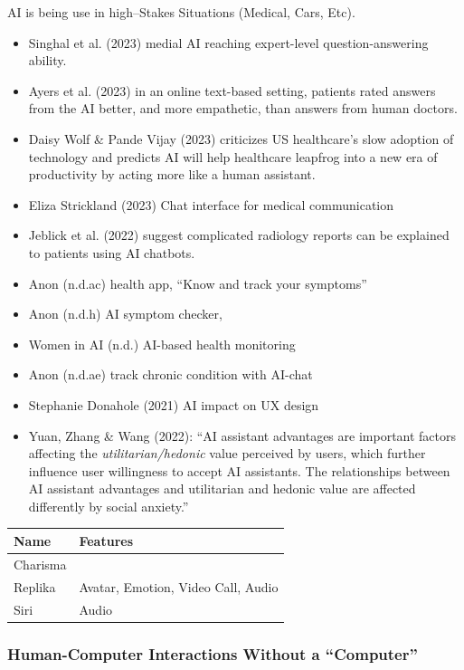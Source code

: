 \documentclass[
  letterpaper,
  DIV=11,
  numbers=noendperiod]{scrartcl}
\begin{document}
AI is being use in high--Stakes Situations (Medical, Cars, Etc).

\begin{itemize}
\item
  Singhal et al. (2023) medial AI reaching expert-level
  question-answering ability.
\item
  Ayers et al. (2023) in an online text-based setting, patients rated
  answers from the AI better, and more empathetic, than answers from
  human doctors.
\item
  Daisy Wolf \& Pande Vijay (2023) criticizes US healthcare's slow
  adoption of technology and predicts AI will help healthcare leapfrog
  into a new era of productivity by acting more like a human assistant.
\item
  Eliza Strickland (2023) Chat interface for medical communication
\item
  Jeblick et al. (2022) suggest complicated radiology reports can be
  explained to patients using AI chatbots.
\item
  Anon (n.d.ac) health app, ``Know and track your symptoms''
\item
  Anon (n.d.h) AI symptom checker,
\item
  Women in AI (n.d.) AI-based health monitoring
\item
  Anon (n.d.ae) track chronic condition with AI-chat
\item
  Stephanie Donahole (2021) AI impact on UX design
\item
  Yuan, Zhang \& Wang (2022): ``AI assistant advantages are important
  factors affecting the \emph{utilitarian/hedonic} value perceived by
  users, which further influence user willingness to accept AI
  assistants. The relationships between AI assistant advantages and
  utilitarian and hedonic value are affected differently by social
  anxiety.''
\end{itemize}

\begin{longtable}[]{@{}ll@{}}
\toprule\noalign{}
Name & Features \\
\midrule\noalign{}
\endhead
\bottomrule\noalign{}
\endlastfoot
Charisma & \\
Replika & Avatar, Emotion, Video Call, Audio \\
Siri & Audio \\
\end{longtable}

\subsubsection{Human-Computer Interactions Without a
``Computer''}\label{human-computer-interactions-without-a-computer}
\end{document}
